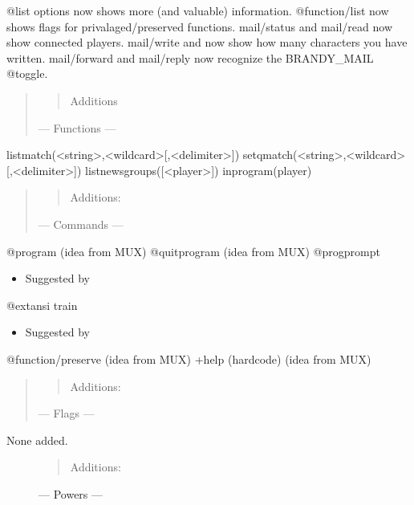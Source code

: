 \documentclass[letterpaper,10pt,english]{sphinxmanual}
\begin{document}
\sphinxAtStartPar
@list options now shows more (and valuable) information.
@function/list now shows flags for privalaged/preserved functions.
mail/status and mail/read now show connected players.
mail/write and \sphinxhyphen{} now show how many characters you have written.
mail/forward and mail/reply now recognize the BRANDY\_MAIL @toggle.
\begin{quote}
\begin{quote}

\sphinxAtStartPar
Additions
\end{quote}

\sphinxAtStartPar
— Functions —
\end{quote}

\sphinxAtStartPar
listmatch(\textless{}string\textgreater{},\textless{}wildcard\textgreater{}{[},\textless{}delimiter\textgreater{}{]})
setqmatch(\textless{}string\textgreater{},\textless{}wildcard\textgreater{}{[},\textless{}delimiter\textgreater{}{]})
listnewsgroups({[}\textless{}player\textgreater{}{]})
inprogram(player)
\begin{quote}
\begin{quote}

\sphinxAtStartPar
Additions:
\end{quote}

\sphinxAtStartPar
— Commands —
\end{quote}

\sphinxAtStartPar
@program (idea from MUX)
@quitprogram (idea from MUX)
@progprompt
\begin{itemize}
\item {} 
\sphinxAtStartPar
Suggested by 

\end{itemize}

\sphinxAtStartPar
@extansi
train
\begin{itemize}
\item {} 
\sphinxAtStartPar
Suggested by 

\end{itemize}

\sphinxAtStartPar
@function/preserve (idea from MUX)
+help (hardcode) (idea from MUX)
\begin{quote}
\begin{quote}

\sphinxAtStartPar
Additions:
\end{quote}

\sphinxAtStartPar
— Flags —
\end{quote}
\begin{description}
\item[{None added.}] \leavevmode\begin{quote}

\sphinxAtStartPar
Additions:
\end{quote}

\sphinxAtStartPar
— Powers —

\end{description}
\end{document}
